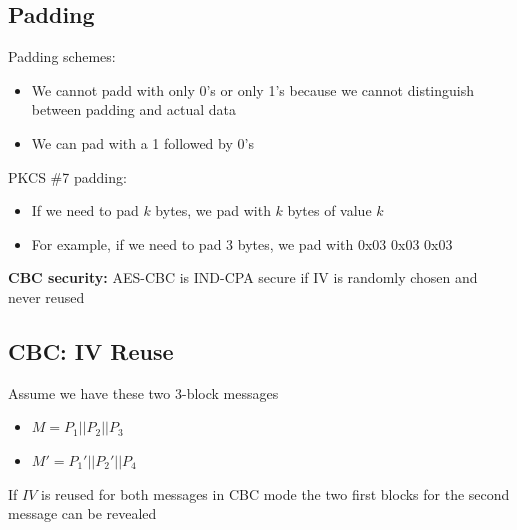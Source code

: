 \documentclass[12pt,a4paper]{article}
\begin{document}
\subsection{Padding}
Padding schemes:
\begin{itemize}
    \item We cannot padd with only 0's or only 1's because we cannot distinguish between padding and actual data
    \item We can pad with a 1 followed by 0's
\end{itemize}
PKCS \#7 padding:
\begin{itemize}
    \item If we need to pad $k$ bytes, we pad with $k$ bytes of value $k$
    \item For example, if we need to pad 3 bytes, we pad with 0x03 0x03 0x03
\end{itemize}

\noindent \textbf{CBC security:} AES-CBC is IND-CPA secure if IV is randomly chosen and never reused

\subsection{CBC: IV Reuse}
Assume we have these two 3-block messages
\begin{itemize}
    \item $M = P_1 || P_2 || P_3$
    \item $M' = P_1' || P_2' || P_4$
\end{itemize}
If $IV$ is reused for both messages in CBC mode the two first blocks for the second message can be revealed
\end{document}
